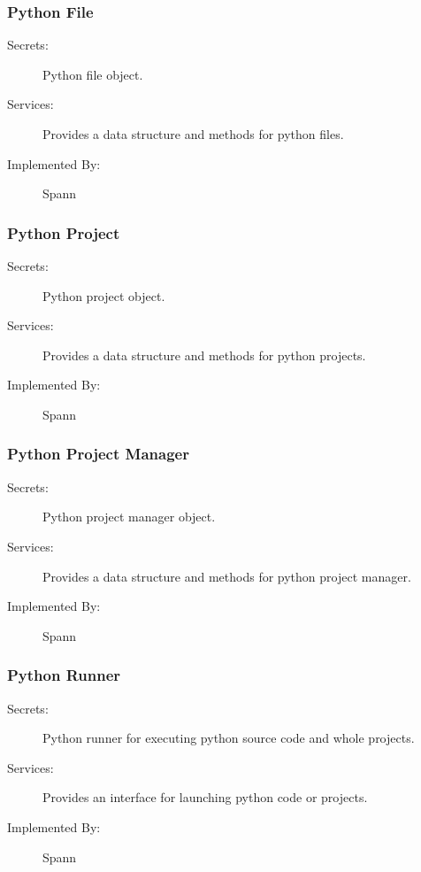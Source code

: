 \documentclass[12pt, titlepage]{article}
\begin{document}
\subsubsection{Python File}

\begin{description}
\item[Secrets:] Python file object.
\item[Services:] Provides a data structure and methods for python files.
\item[Implemented By:] Spann
\end{description}

\subsubsection{Python Project}

\begin{description}
\item[Secrets:] Python project object.
\item[Services:] Provides a data structure and methods for python projects.
\item[Implemented By:] Spann
\end{description}

\subsubsection{Python Project Manager}

\begin{description}
\item[Secrets:] Python project manager object.
\item[Services:] Provides a data structure and methods for python project manager.
\item[Implemented By:] Spann
\end{description}

\subsubsection{Python Runner}

\begin{description}
\item[Secrets:] Python runner for executing python source code and whole projects.
\item[Services:] Provides an interface for launching python code or projects.
\item[Implemented By:] Spann
\end{description}
\end{document}
